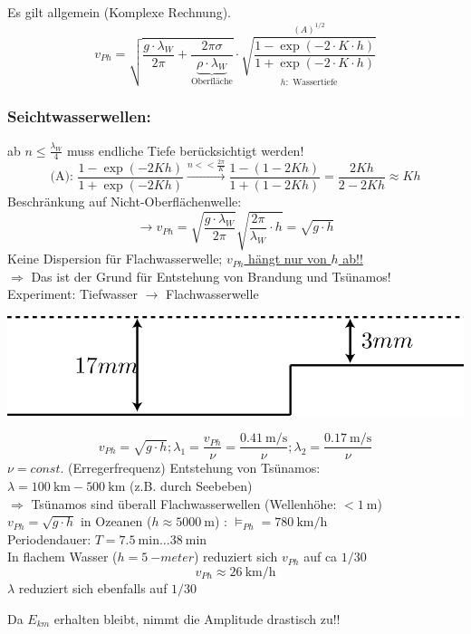 Es gilt allgemein (Komplexe Rechnung).\\
$$ v_{Ph} = \sqrt{\frac{g\cdot\lambda_W}{2\pi}+\frac{2\pi\sigma}{\underbrace{\rho\cdot\lambda_W}_{\text{Oberfläche}}}} \cdot \overset{(A)^{1/2}}{\underset{h: \text{ Wassertiefe}}{\sqrt{\frac{1-\exp(-2\cdot K \cdot h)}{1+\exp(-2 \cdot K \cdot h)}}}}$$

\subsubsection{Seichtwasserwellen:}
ab $  n \leq \frac{\lambda_W}{4} $ muss endliche Tiefe berücksichtigt werden!\\
$$\text{(A): } \frac{1-\exp(-2Kh)}{1+\exp(-2Kh)} \overset{n<<\frac{2\pi}{K}}{\longrightarrow} \frac{1-(1-2Kh)}{1+(1-2Kh)} = \frac{2Kh}{2-2Kh} \approx Kh$$
Beschränkung auf Nicht-Oberflächenwelle:\\
$$ \rightarrow v_{Ph} = \sqrt{\frac{g\cdot\lambda_W}{2\pi}} \sqrt{\frac{2\pi}{\lambda_W}\cdot h} = \sqrt{g \cdot h} $$
Keine Dispersion für Flachwasserwelle; \underline{$ v_{Ph}  $ hängt nur von $ h $ ab!!}\\
$ \Rightarrow $ Das ist der Grund für Entstehung von Brandung und Tsünamos!\\
Experiment: Tiefwasser $ \rightarrow $ Flachwasserwelle\\
\begin{center}
	\includegraphics[width=0.5\linewidth]{skizzen/19/19B28}
\end{center}
$$ v_{Ph}  = \sqrt{g\cdot h}; \lambda_1 = \frac{v_{Ph}}{\nu} = \frac{\SI{0,41}{\meter\per\second}}{\nu}; \lambda_2 = \frac{\SI{0,17}{\meter\per\second}}{\nu} $$
$ \nu  = const.$ (Erregerfrequenz)
Entstehung von Tsünamos:\\
$ \lambda=\SI{100}{\kilo\meter} - \SI{500}{\kilo\meter} $ (z.B. durch Seebeben)\\
$ \Rightarrow $ Tsünamos sind überall Flachwasserwellen (Wellenhöhe: $ <\SI{1}{\meter} $)\\
$ v_{Ph} = \sqrt{g\cdot h} $ in Ozeanen ($ h \approx \SI{5000}{\meter} $) : $ \vDash_{Ph} =\SI{780}{\kilo\meter\per\hour} $\\
Periodendauer: $ T=\SI{7,5}{\minute} ... \SI{38}{\minute} $\\
In flachem Wasser ($ h=\SI{5}{-meter} $) reduziert sich $ v_{Ph}  $ auf ca $ 1/30 $
$$ v_{Ph}  \approx \SI{26}{\kilo\meter\per\hour}$$
$ \lambda $ reduziert sich ebenfalls auf $ 1/30 $
\begin{tcolorbox} [colback = {White}, outer arc=0mm, sharp corners]
	Da $ E_{km} $ erhalten bleibt, nimmt die Amplitude drastisch zu!!
\end{tcolorbox}